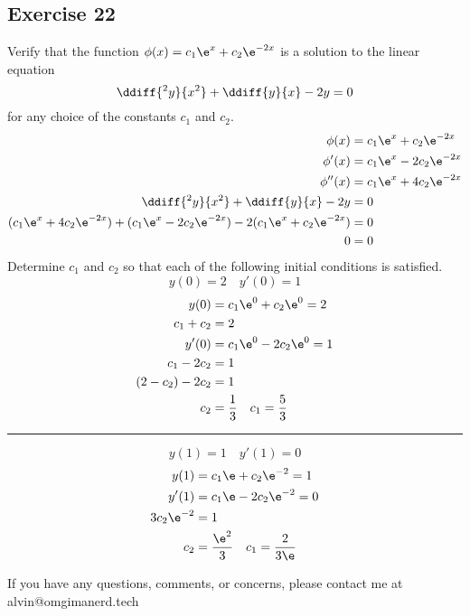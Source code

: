 \documentclass{math}
\begin{document}
\subsection*{Exercise 22}
Verify that the function \( \phi(x) = c_1\e^x+c_2\e^{-2x} \) is a solution to
the linear equation
\[ \ddiff{^2y}{x^2}+\ddiff{y}{x}-2y = 0 \]
for any choice of the constants \( c_1 \) and \( c_2 \).
\begin{align*}
  \phi(x) &= c_1\e^x+c_2\e^{-2x} \\
  \phi'(x) &= c_1\e^x-2c_2\e^{-2x} \\
  \phi''(x) &= c_1\e^x+4c_2\e^{-2x} \\
  \ddiff{^2y}{x^2}+\ddiff{y}{x}-2y &= 0 \\
  (c_1\e^x+4c_2\e^{-2x})+(c_1\e^x-2c_2\e^{-2x})-2(c_1\e^x+c_2\e^{-2x}) &= 0 \\
  0 &= 0
\end{align*}
Determine \( c_1 \) and \( c_2 \) so that each of the following initial
conditions is satisfied.
\[ y(0) = 2 \quad y'(0) = 1 \]
\begin{align*}
  y(0) &= c_1\e^0+c_2\e^0 = 2 \\
  c_1+c_2 &= 2 \\
  y'(0) &= c_1\e^0-2c_2\e^0 = 1 \\
  c_1-2c_2 &= 1 \\
  (2-c_2)-2c_2 &= 1 \\
  c_2 &= \frac{1}{3} \quad c_1 = \frac{5}{3}
\end{align*}
\rule{18cm}{0.4pt}
\[ y(1) = 1 \quad y'(1) = 0 \]
\begin{align*}
  y(1) &= c_1\e+c_2\e^{-2} = 1 \\
  y'(1) &= c_1\e-2c_2\e^{-2} = 0 \\
  3c_2\e^{-2} &= 1 \\
  c_2 &= \frac{\e^2}{3} \quad c_1 = \frac{2}{3\e}
\end{align*}

\begin{center}
  If you have any questions, comments, or concerns, please contact me at
  alvin@omgimanerd.tech
\end{center}
\end{document}

